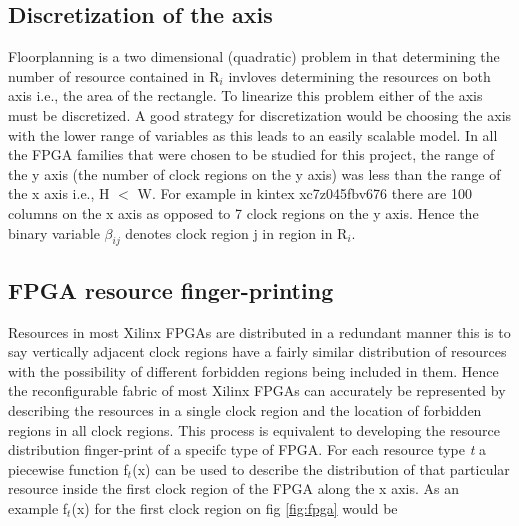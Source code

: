 \subsection{Discretization of the axis}
Floorplanning is a two dimensional (quadratic) problem in that determining the number of resource contained in R$_i$ invloves determining the resources on both axis i.e., the area of the rectangle. To linearize this problem either of the axis must be discretized. A good strategy for discretization would be choosing the axis with the lower range of variables as this leads to an easily scalable model. In all the FPGA families that were chosen to be studied for this project, the range of the y axis (the number of clock regions on the y axis) was less than the range of the x axis i.e., H $<$ W. For example in kintex xc7z045fbv676 there are 100 columns on the x axis as opposed to 7 clock regions on the y axis. Hence the binary variable $\beta_{ij}$ denotes clock region j in region in R$_i$. \\


\subsection{FPGA resource finger-printing} 
Resources in most Xilinx FPGAs are distributed in a redundant manner this is to say vertically adjacent clock regions have a fairly similar distribution of resources with the possibility of different forbidden regions being included in them. Hence the reconfigurable fabric of most Xilinx FPGAs can accurately be represented by describing the resources in a single clock region and the location of forbidden regions in all clock regions. This process is equivalent to developing the resource distribution finger-print of a specifc type of FPGA. For each resource type \textit{t} a piecewise function f$_t$(x) can be used to describe the distribution of that particular resource inside the first clock region of the FPGA along the x axis. As an example f$_t$(x) for the first clock region on fig \ref{fig:fpga} would be 

